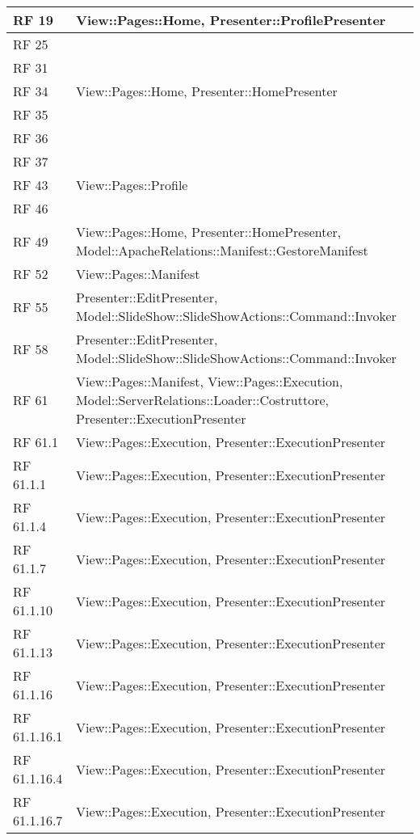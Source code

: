 {\begin{longtable} [c]{| p{2cm} | p{14cm} |}
 \hline 
RF 19 & View::Pages::\-Home, Presenter::\-ProfilePresenter\\ 
 \hline 
RF 25 & \\ 
 \hline 
RF 31 & \\ 
 \hline 
RF 34 & View::Pages::\-Home, Presenter::\-HomePresenter\\ 
 \hline 
RF 35 & \\ 
 \hline 
RF 36 & \\ 
 \hline 
RF 37 & \\ 
 \hline 
RF 43 & View::Pages::\-Profile\\ 
 \hline 
RF 46 & \\ 
 \hline 
RF 49 & View::Pages::\-Home, Presenter::\-HomePresenter, Model::ApacheRelations::Manifest::\-GestoreManifest\\ 
 \hline 
RF 52 & View::Pages::\-Manifest\\ 
 \hline 
RF 55 & Presenter::\-EditPresenter, Model::SlideShow::SlideShowActions::Command::\-Invoker\\ 
 \hline 
RF 58 & Presenter::\-EditPresenter, Model::SlideShow::SlideShowActions::Command::\-Invoker\\ 
 \hline 
RF 61 & View::Pages::\-Manifest, View::Pages::\-Execution, Model::ServerRelations::Loader::\-Costruttore, Presenter::\-ExecutionPresenter\\ 
 \hline 
RF 61.1 & View::Pages::\-Execution, Presenter::\-ExecutionPresenter\\ 
 \hline 
RF 61.1.1 & View::Pages::\-Execution, Presenter::\-ExecutionPresenter\\ 
 \hline 
RF 61.1.4 & View::Pages::\-Execution, Presenter::\-ExecutionPresenter\\ 
 \hline 
RF 61.1.7 & View::Pages::\-Execution, Presenter::\-ExecutionPresenter\\ 
 \hline 
RF 61.1.10 & View::Pages::\-Execution, Presenter::\-ExecutionPresenter\\ 
 \hline 
RF 61.1.13 & View::Pages::\-Execution, Presenter::\-ExecutionPresenter\\ 
 \hline 
RF 61.1.16 & View::Pages::\-Execution, Presenter::\-ExecutionPresenter\\ 
 \hline 
RF 61.1.16.1 & View::Pages::\-Execution, Presenter::\-ExecutionPresenter\\ 
 \hline 
RF 61.1.16.4 & View::Pages::\-Execution, Presenter::\-ExecutionPresenter\\ 
 \hline 
RF 61.1.16.7 & View::Pages::\-Execution, Presenter::\-ExecutionPresenter\\ 

\end{longtable}}

